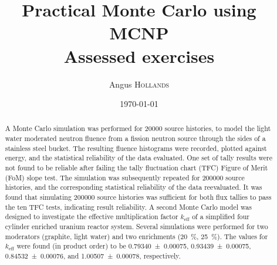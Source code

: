 \documentclass{article}
\title{Practical Monte Carlo using MCNP \\ Assessed exercises} %
\author{Angus \textsc{Hollands}} %
\date{\today} %
\begin{document}
\maketitle %


\begin{abstract}
  A Monte Carlo simulation was performed for \num{20000} source histories, to model the light water moderated neutron fluence from a fission neutron source through the sides of a stainless steel bucket. The resulting fluence histograms were recorded, plotted against energy, and the statistical reliability of the data evaluated. One set of tally results were not found to be reliable after failing the tally fluctuation chart (TFC) Figure of Merit (FoM) slope test. The simulation was subsequently repeated for \num{200000} source histories, and the corresponding statistical reliability of the data re\textendash evaluated. It was found that simulating \num{200000} source histories was sufficient for both flux tallies to pass the ten TFC tests, indicating result reliability.
  A second Monte Carlo model was designed to investigate the effective multiplication factor $k_{\text{eff}}$ of a simplified four cylinder enriched uranium reactor system. Several simulations were performed for two moderators (graphite, light water) and two enrichments (\SI{20}{\percent}, \SI{25}{\percent}). The values for $k_{\text{eff}}$ were found (in product order) to be \num{0.79340 \pm 0.00075}, \num{0.93439 \pm 0.00075}, \num{0.84532 \pm 0.00076}, and \num{1.00507 \pm 0.00078}, respectively.
\end{abstract}
\end{document}
